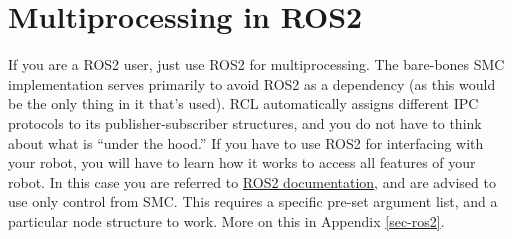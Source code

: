 \section{Multiprocessing in ROS2}
If you are a ROS2 user, just use ROS2 for multiprocessing.
The bare-bones SMC implementation serves primarily to avoid 
ROS2 as a dependency (as this would be the only thing in it that's used).
RCL automatically assigns different IPC protocols to
its publisher-subscriber structures, and you do not have to think
about what is ``under the hood.''
If you have to use ROS2 for interfacing with your robot,
you will have to learn how it works to access all features of your robot.
In this case you are referred to \href{https://docs.ros.org/en/rolling/index.html}{ROS2 documentation},
and are advised to use only control from SMC.
This requires a specific pre-set argument list, and a particular node structure
to work. More on this in Appendix \ref{sec-ros2}.
